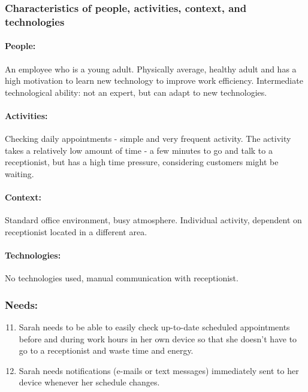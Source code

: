 \documentclass{article}
\begin{document}
\subsubsection{Characteristics of people, activities, context, and technologies}
\paragraph{\small People:}  An employee who is a young adult. Physically average, healthy adult and has a high motivation to learn new technology to improve work efficiency. Intermediate technological ability: not an expert, but can adapt to new technologies.
\paragraph{\small Activities:} Checking daily appointments - simple and very frequent activity. The activity takes a relatively low amount of time - a few minutes to go and talk to a receptionist, but has a high time pressure, considering customers might be waiting.
\paragraph{\small Context:} Standard office environment, busy atmosphere. Individual activity, dependent on receptionist located in a different area.
\paragraph{\small Technologies:} No technologies used, manual communication with receptionist.

\subsubsection{Needs:}
\label{N11-12}
\begin{enumerate}[label=N\arabic*.]
\setcounter{enumi}{10}
\item Sarah needs to be able to easily check up-to-date scheduled appointments before and during work hours in her own device so that she doesn't have to go to a receptionist and waste time and energy.
\item Sarah needs notifications (e-mails or text messages) immediately sent to her device whenever her schedule changes.
\end{enumerate}
\end{document}
